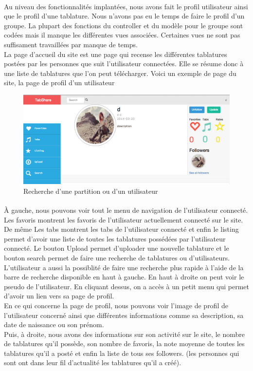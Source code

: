 \paragraph{}
Au niveau des fonctionnalités implantées, nous avons fait le profil utilisateur ainsi que le profil d'une tablature. Nous n'avons pas eu le temps de faire le profil d'un groupe. La plupart des fonctions du controller et du modèle pour le groupe sont codées mais il manque les différentes vues associées. Certaines vues ne sont pas suffisament travaillées par manque de temps. \\
La page d'accueil du site est une page qui recense les différentes tablatures postées par les personnes que suit l'utilisateur connectées.
Elle se résume donc à une liste de tablatures que l'on peut télécharger.
Voici un exemple de page du site, la page de profil d'un utilisateur

\begin{figure}[H]
\centering
\includegraphics[scale=0.5]{profilUserWeb}
\caption{Recherche d'une partition ou d'un utilisateur}
\end{figure}

\paragraph{}
À gauche, nous pouvons voir tout le menu de navigation de l'utilisateur connecté.
Les favoris montrent les favoris de l'utilisateur actuellement connecté sur le site. De même Les tabs montrent les tabs de l'utilisateur connecté et enfin le listing permet d'avoir une liste de toutes les tablatures possédées par l'utilisateur connecté. Le bouton Upload permet d'uploader une nouvelle tablature et le bouton search permet de faire une recherche de tablatures ou d'utilisateurs. L'utilisateur a aussi la possiblité de faire une recherche plus rapide à l'aide de la barre de recherche disponible en haut à gauche. En haut à droite on peut voir le pseudo de l'utilisateur. En cliquant dessus, on a accès à un petit menu qui permet d'avoir un lien vers sa page de profil. \\
En ce qui concerne la page de profil, nous pouvons voir l'image de profil de l'utilisateur concerné ainsi que différentes informations comme sa description, sa date de naissance ou son prénom. \\
Puis, à droite, nous avons des informations sur son activité sur le site, le nombre de tablatures qu'il possède, son nombre de favoris, la note moyenne de toutes les tablatures qu'il a posté et enfin la liste de tous ses followers. (les personnes qui sont ont dans leur fil d'actualité les tablatures qu'il a créé).
